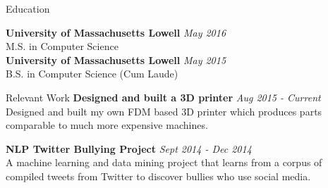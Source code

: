 \documentclass{resume} %
\begin{document}
    \begin{rSection}{Education}

    {\bf University of Massachusetts Lowell}
        \hfill {\em May 2016} \\
        M.S. in Computer Science  \smallskip \\
        {\bf University of Massachusetts Lowell} \hfill {\em May 2015} \\
        B.S. in Computer Science (Cum Laude)  \smallskip \\

    \end{rSection}

    \begin{rSection}{Relevant Work}
    {\bf Designed and built a 3D printer}
        \hfill {\em Aug 2015 - Current} \\
        Designed and built my own FDM based 3D printer which produces parts comparable to much more expensive machines.

        {\bf NLP Twitter Bullying Project} \hfill {\em Sept 2014 - Dec 2014} \\
        A machine learning and data mining project that learns from a corpus of compiled tweets from Twitter to discover bullies who use social media.


    \end{rSection}


    \newpage %

\end{document}
